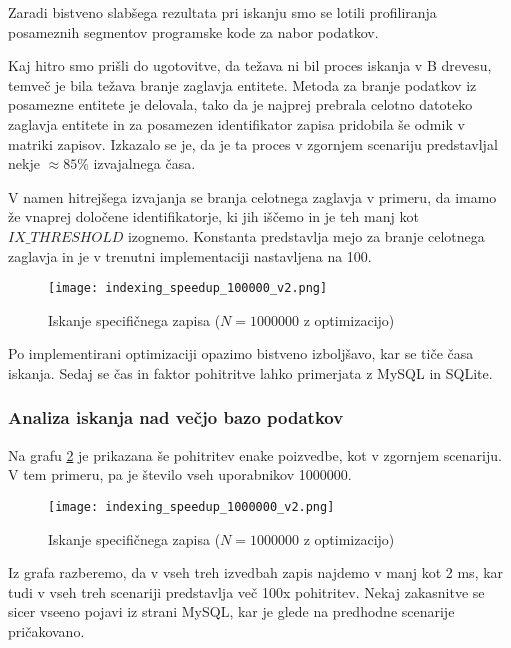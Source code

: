 \documentclass[a4paper,12pt,openright]{book}
\begin{document}
    Zaradi bistveno slabšega rezultata pri iskanju smo se lotili profiliranja posameznih segmentov programske kode za nabor podatkov.

    Kaj hitro smo prišli do ugotovitve, da težava ni bil proces iskanja v B drevesu, temveč je bila težava branje zaglavja entitete. Metoda za branje podatkov iz posamezne entitete je delovala, tako da je najprej prebrala celotno datoteko zaglavja entitete in za posamezen identifikator zapisa pridobila še odmik v matriki zapisov. Izkazalo se je, da je ta proces v zgornjem scenariju predstavljal nekje $\approx 85$\% izvajalnega časa.

    V namen hitrejšega izvajanja se branja celotnega zaglavja v primeru, da imamo že vnaprej določene identifikatorje, ki jih iščemo in je teh manj kot $IX\_THRESHOLD$ izognemo. Konstanta predstavlja mejo za branje celotnega zaglavja in je v trenutni implementaciji nastavljena na \num{100}.
    
    \begin{figure}[H]
        \centerline{\texttt{[image: indexing\_speedup\_100000\_v2.png]}}
        \caption{Iskanje specifičnega zapisa ($N = \num{1000000}$ z optimizacijo)}
        \label{idx_speedup}
    \end{figure}

    \noindent
    Po implementirani optimizaciji opazimo bistveno izboljšavo, kar se tiče časa iskanja. Sedaj se čas in faktor pohitritve lahko primerjata z MySQL in SQLite.

    \subsubsection{Analiza iskanja nad večjo bazo podatkov}

    Na grafu \ref{idx_speedup_2} je prikazana še pohitritev enake poizvedbe, kot v zgornjem scenariju. V tem primeru, pa je število vseh uporabnikov \num{1000000}.
    
    \begin{figure}[H]
        \centerline{\texttt{[image: indexing\_speedup\_1000000\_v2.png]}}
        \caption{Iskanje specifičnega zapisa ($N = \num{1000000}$ z optimizacijo)}
        \label{idx_speedup_2}
    \end{figure}

    \noindent
    Iz grafa razberemo, da v vseh treh izvedbah zapis najdemo v manj kot 2 ms, kar tudi v vseh treh scenariji predstavlja več 100x pohitritev. Nekaj zakasnitve se sicer vseeno pojavi iz strani MySQL, kar je glede na predhodne scenarije pričakovano.
\end{document}
